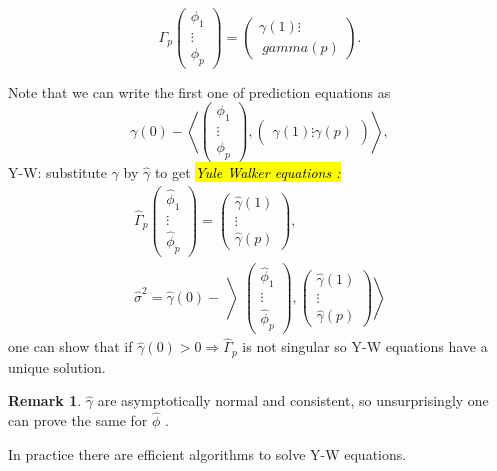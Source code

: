 \documentclass[12pt,a4paper, notitlepage]{book}
\newcommand{\hlc}[2][yellow]{ {\sethlcolor{#1} \hl{#2}} }
\theoremstyle{definition} %
\newtheorem{remark}[definition]{Remark}
\theoremstyle{plain} %
\newcommand{\Important}[1]{ {\it \hlc{#1} } }
\begin{document}
\[ \Gamma _p \left( \begin{array}{c} \phi _1 \\ \vdots \\ \phi _p \end{array} \right) = \left( \begin{array}{c} \gamma (1) \vdots \\ \ gamma (p) \end{array} \right) . \]

Note that we can write the first one of prediction equations as
\[ \gamma (0)  - \left< \left( \begin{array} {c} \phi _1 \\ \vdots \\ \phi _p \end{array} \right) , \left( \begin{array} {c} \gamma(1) \vdots \gamma(p) \end{array} \right) \right> , \]
Y-W: substitute $ \gamma $ by $ \hat{\gamma} $ to get 
\Important{ Yule Walker equations : }
\begin{align*}
 \hat{\Gamma} _p  \left( \begin{array} {c} \hat{\phi} _1 \\ \vdots \\ \hat{\phi} _p \end{array} \right) = \left( \begin{array}{c} \hat{\gamma}(1) \\ \vdots \\ \hat{\gamma}(p) \end{array} \right)  , \\
\hat{\sigma} ^2 = \hat{\gamma}(0) - \left> \left(\begin{array}{c} \hat{\phi}_1 \\ \vdots \\ \hat{\phi}_p \end{array} \right) , \left( \begin{array}{c} \hat{\gamma}(1) \\ \vdots \\ \hat{\gamma} (p) \end{array} \right) \right> 
\end{align*} 
one can show that if $ \hat{\gamma}(0) >0 \Rightarrow \hat{ \Gamma} _p $ is not singular so 
Y-W equations have a unique solution.

\begin{remark}
$ \hat{\gamma} $ are asymptotically normal and consistent, so unsurprisingly one can prove the same for $ \hat{\phi} $ .

In practice there are efficient algorithms to solve Y-W equations.
\end{remark}
\end{document}
